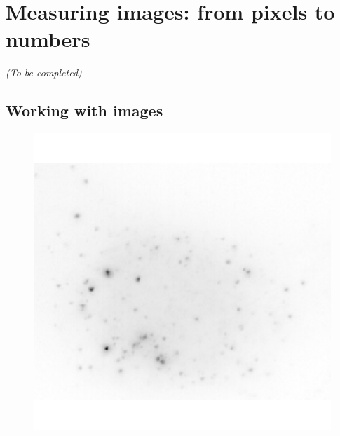 \section{Measuring images: from pixels to numbers}
\label{sec:computation_biology}

\begin{center}
	\textit{(To be completed)}
\end{center}

\subsection{Working with images}
\label{subsec:intro_images}


\begin{figure}[]
	\centering
		\includegraphics[width=0.95\linewidth]{figures/introduction/real_image_foci}
		\vfill

\end{figure}
